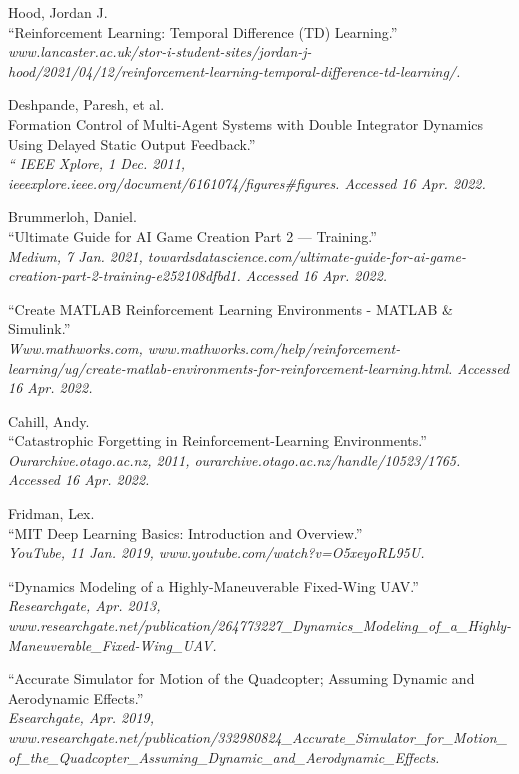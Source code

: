 \begin{thebibliography}{9}
Hood, Jordan J.\\
“Reinforcement Learning: Temporal Difference (TD) Learning.”\\
\textit{www.lancaster.ac.uk/stor-i-student-sites/jordan-j-hood/2021/04/12/reinforcement-learning-temporal-difference-td-learning/.}

Deshpande, Paresh, et al.\\
Formation Control of Multi-Agent Systems with Double Integrator Dynamics Using Delayed Static Output Feedback.”\\
\textit{ “ IEEE Xplore, 1 Dec. 2011, ieeexplore.ieee.org/document/6161074/figures\#figures. Accessed 16 Apr. 2022.}

Brummerloh, Daniel.\\
“Ultimate Guide for AI Game Creation Part 2 — Training.”\\
\textit{ Medium, 7 Jan. 2021, towardsdatascience.com/ultimate-guide-for-ai-game-creation-part-2-training-e252108dfbd1. Accessed 16 Apr. 2022.}


“Create MATLAB Reinforcement Learning Environments - MATLAB \& Simulink.”\\
\textit{ Www.mathworks.com, www.mathworks.com/help/reinforcement-learning/ug/create-matlab-environments-for-reinforcement-learning.html. Accessed 16 Apr. 2022.}

Cahill, Andy. \\
“Catastrophic Forgetting in Reinforcement-Learning Environments.”\\
\textit{ Ourarchive.otago.ac.nz, 2011, ourarchive.otago.ac.nz/handle/10523/1765. Accessed 16 Apr. 2022.}

Fridman, Lex.\\
“MIT Deep Learning Basics: Introduction and Overview.”\\
\textit{ YouTube, 11 Jan. 2019, www.youtube.com/watch?v=O5xeyoRL95U.}

“Dynamics Modeling of a Highly-Maneuverable Fixed-Wing UAV.”\\
\textit{ Researchgate, Apr. 2013, www.researchgate.net/publication/264773227\_Dynamics\_Modeling\_of\_a\_Highly-Maneuverable\_Fixed-Wing\_UAV.}

“Accurate Simulator for Motion of the Quadcopter; Assuming Dynamic and Aerodynamic Effects.”\\
\textit{ Esearchgate, Apr. 2019, www.researchgate.net/publication/332980824\_Accurate\_Simulator\_for\_Motion\_of\_the\_Quadcopter\_Assuming\_Dynamic\_and\_Aerodynamic\_Effects.}


\end{thebibliography}
